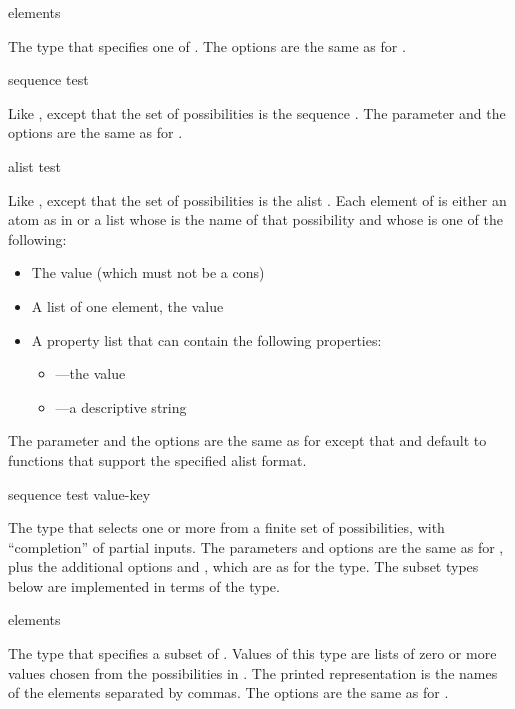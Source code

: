  {\rest elements}

The type that specifies one of .  The options are the same as for
.


 {sequence \key test}

Like , except that the set of possibilities is the sequence
.  The parameter  and the options are the same as for
.


 {alist \key test}

Like , except that the set of possibilities is the alist .
Each element of  is either an atom as in  or a
list whose  is the name of that possibility and whose  is one of
the following:

\begin{itemize}
\item The value (which must not be a cons)

\item A list of one element, the value

\item A property list that can contain the following properties:
  \begin{itemize}
  \item {}---the value
  \item {}---a descriptive string
  \end{itemize}
\end{itemize}

The  parameter and the options are the same as for 
except that  and  default to functions
that support the specified alist format.


 {sequence \key test value-key}

The type that selects one or more from a finite set of possibilities, with
``completion'' of partial inputs.  The parameters and options are the same as
for , plus the additional options  and
, which are as for the  type.  The subset types
below are implemented in terms of the  type.


 {\rest elements}

The type that specifies a subset of .  Values of this type are
lists of zero or more values chosen from the possibilities in .
The printed representation is the names of the elements separated by commas.
The options are the same as for .


